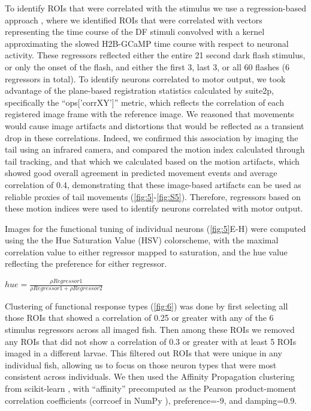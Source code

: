 \documentclass[9pt,lineno]{RandlettLab_elife}
\begin{document}
To identify ROIs that were correlated with the stimulus we use a regression-based approach \cite{Miri2011-nl}, where we identified ROIs that were correlated with vectors representing the time course of the DF stimuli convolved with a kernel approximating the slowed H2B-GCaMP time course with respect to neuronal activity. These regressors reflected either the entire 21 second dark flash stimulus, or only the onset of the flash, and either the first 3, last 3, or all 60 flashes (6 regressors in total). To identify neurons correlated to motor output, we took advantage of the plane-based registration statistics calculated by suite2p, specifically the “ops['corrXY']” metric, which reflects the correlation of each registered image frame with the reference image. We reasoned that movements would cause image artifacts and distortions that would be reflected as a transient drop in these correlations. Indeed, we confirmed this association by imaging the tail using an infrared camera, and compared the motion index calculated through tail tracking, and that which we calculated based on the motion artifacts, which showed good overall agreement in predicted movement events and average correlation of 0.4, demonstrating that these image-based artifacts can be used as reliable proxies of tail movements (\autoref{fig:5}-\autoref{fig:S5}). Therefore, regressors based on these motion indices were used to identify neurons correlated with motor output. 

Images for the functional tuning of individual neurons (\autoref{fig:5}E-H) were computed using the the Hue Saturation Value (HSV) colorscheme, with the maximal correlation value to either regressor mapped to saturation, and the hue value reflecting the preference for either regressor. 
\begin{center}
$ hue = \frac{\rho Regressor1}{\rho Regressor1 + \rho Regressor2} $
\end{center}
Clustering of functional response types (\autoref{fig:6}) was done by first selecting all those ROIs that showed a correlation of 0.25 or greater with any of the 6 stimulus regressors across all imaged fish. Then among these ROIs we removed any ROIs that did not show a correlation of 0.3 or greater with at least 5 ROIs imaged in a different larvae. This filtered out ROIs that were unique in any individual fish, allowing us to focus on those neuron types that were most consistent across individuals. We then used the Affinity Propagation clustering from scikit-learn \cite{Pedregosa2011-dj}, with “affinity” precomputed as the Pearson product-moment correlation coefficients (corrcoef in NumPy \cite{Harris2020-bg}), preference=-9, and damping=0.9. 
\end{document}
